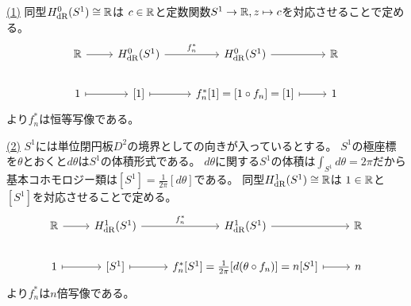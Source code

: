 \documentclass[report, notitlepage]{jlreq}
\begin{document}
\begin{answer}
    \uline{(1)} \quad
    同型$H_{\mathrm{dR}}^0(S^1) \cong \mathbb{R}$は
    $c \in \mathbb{R}$と定数関数$S^1 \to \mathbb{R}, z \mapsto c$を対応させることで定める。
    \begin{equation}
        \begin{tikzcd}
            \R
                \ar{r}
                & H_\dR^0(S^1)
                    \ar{r}{f_n^*}
                & H_\dR^0(S^1)
                    \ar{r}
                & \R \\
            1
                \ar[mapsto]{r}
                & {[1]}
                    \ar[mapsto]{r}
                & f_n^*{[1]} = [1 \circ f_n] = [1]
                    \ar[mapsto]{r}
                & 1
        \end{tikzcd}
    \end{equation}
    より$f_n^*$は恒等写像である。

    \uline{(2)} \quad
    $S^1$には単位閉円板$D^2$の境界としての向きが入っているとする。
    $S^1$の極座標を$\theta$とおくと$d\theta$は$S^1$の体積形式である。
    $d\theta$に関する$S^1$の体積は$\int_{S^1} d\theta = 2\pi$だから
    基本コホモロジー類は$[S^1] = \frac{1}{2\pi} [d\theta]$である。
    同型$H_{\mathrm{dR}}^1(S^1) \cong \mathbb{R}$は
    $1 \in \mathbb{R}$と$[S^1]$を対応させることで定める。
    \begin{equation}
        \begin{tikzcd}
            \R
                \ar{r}
                & H_\dR^1(S^1)
                    \ar{r}{f_n^*}
                & H_\dR^1(S^1)
                    \ar{r}
                & \R \\
            1
                \ar[mapsto]{r}
                & {[S^1]}
                    \ar[mapsto]{r}
                & f_n^*{[S^1]}
                    = \frac{1}{2\pi}[d(\theta \circ f_n)]
                    = n [S^1]
                    \ar[mapsto]{r}
                & n
        \end{tikzcd}
    \end{equation}
    より$f_n^*$は$n$倍写像である。
\end{answer}
\end{document}
